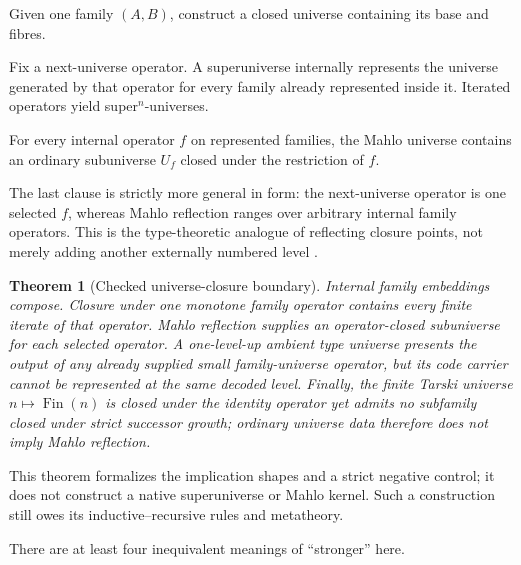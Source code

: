 \documentclass[11pt]{article}
\newtheorem{theorem}{Theorem}
\theoremstyle{definition}
\theoremstyle{remark}
\begin{document}
\begin{description}[leftmargin=3.1cm,style=nextline]
\item[Family enclosure.] Given one family $(A,B)$, construct a closed universe
  containing its base and fibres.
\item[Superuniverse.] Fix a next-universe operator.  A superuniverse internally
  represents the universe generated by that operator for every family already
  represented inside it.  Iterated operators yield super$^n$-universes.
\item[Mahlo reflection.] For every internal operator $f$ on represented
  families, the Mahlo universe contains an ordinary subuniverse $U_f$ closed
  under the restriction of $f$.
\end{description}

The last clause is strictly more general in form: the next-universe operator is
one selected $f$, whereas Mahlo reflection ranges over arbitrary internal family
operators.  This is the type-theoretic analogue of reflecting closure points,
not merely adding another externally numbered level
\cite{PalmgrenUniverses,SetzerMahlo,DybjerSetzerMahlo}.

\begin{theorem}[Checked universe-closure boundary]
Internal family embeddings compose.  Closure under one monotone family operator
contains every finite iterate of that operator.  Mahlo reflection supplies an
operator-closed subuniverse for each selected operator.  A one-level-up ambient
type universe presents the output of any already supplied small family-universe
operator, but its code carrier cannot be represented at the same decoded level.
Finally, the finite Tarski universe $n\mapsto\operatorname{Fin}(n)$ is closed
under the identity operator yet admits no subfamily closed under strict successor
growth; ordinary universe data therefore does not imply Mahlo reflection.
\end{theorem}

This theorem formalizes the implication shapes and a strict negative control; it
does not construct a native superuniverse or Mahlo kernel.  Such a construction
still owes its inductive--recursive rules and metatheory.

There are at least four inequivalent meanings of ``stronger'' here.
\end{document}

